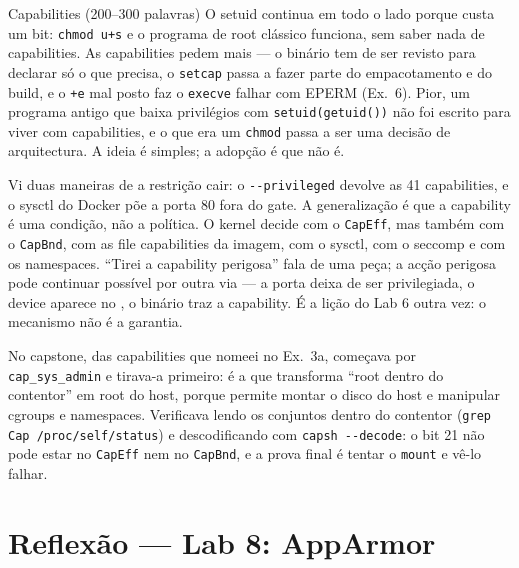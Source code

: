 \documentclass[a4paper,11pt]{article}
\newcommand{\cmd}[1]{\textcolor{sscnblue}{\texttt{#1}}}
\newcommand{\file}[1]{\texttt{\detokenize{#1}}}
\begin{document}
\begin{callout}{Capabilities (200--300 palavras)}
\setlength{\parskip}{5pt}%
O setuid continua em todo o lado porque custa um bit: \cmd{chmod u+s} e o programa de
root cl\'assico funciona, sem saber nada de capabilities. As capabilities pedem mais
--- o bin\'ario tem de ser revisto para declarar s\'o o que precisa, o \cmd{setcap}
passa a fazer parte do empacotamento e do build, e o \cmd{+e} mal posto faz o
\cmd{execve} falhar com EPERM (Ex.~6). Pior, um programa antigo que baixa privil\'egios
com \cmd{setuid(getuid())} n\~ao foi escrito para viver com capabilities, e o que era um
\cmd{chmod} passa a ser uma decis\~ao de arquitectura. A ideia \'e simples; a
adop\c{c}\~ao \'e que n\~ao \'e.

Vi duas maneiras de a restri\c{c}\~ao cair: o \cmd{-{}-privileged} devolve as 41
capabilities, e o sysctl do Docker p\~oe a porta 80 fora do gate. A generaliza\c{c}\~ao
\'e que a capability \'e uma condi\c{c}\~ao, n\~ao a pol\'itica. O kernel decide com o
\cmd{CapEff}, mas tamb\'em com o \cmd{CapBnd}, com as file capabilities da imagem, com
o sysctl, com o seccomp e com os namespaces. ``Tirei a capability perigosa'' fala de
uma pe\c{c}a; a ac\c{c}\~ao perigosa pode continuar poss\'ivel por outra via --- a porta
deixa de ser privilegiada, o device aparece no \file{/dev}, o bin\'ario traz a
capability. \'E a li\c{c}\~ao do Lab 6 outra vez: o mecanismo n\~ao \'e a garantia.

No capstone, das capabilities que nomeei no Ex.~3a, come\c{c}ava por
\cmd{cap\_sys\_admin} e tirava-a primeiro: \'e a que transforma ``root dentro do
contentor'' em root do host, porque permite montar o disco do host e manipular cgroups
e namespaces. Verificava lendo os conjuntos dentro do contentor
(\cmd{grep Cap /proc/self/status}) e descodificando com \cmd{capsh -{}-decode}: o bit 21
n\~ao pode estar no \cmd{CapEff} nem no \cmd{CapBnd}, e a prova final \'e tentar o
\cmd{mount} e v\^e-lo falhar.
\end{callout}

\section{Reflex\~ao --- Lab 8: AppArmor}
\end{document}
